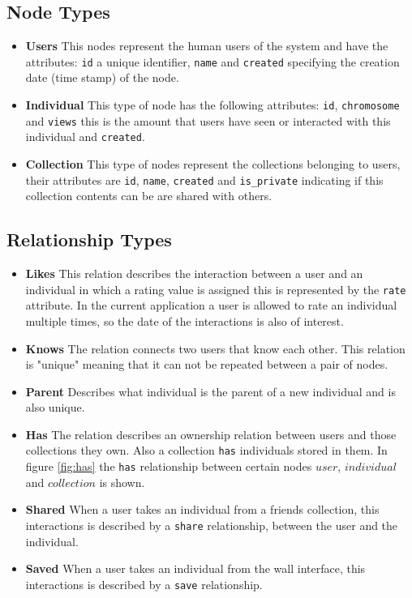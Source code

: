\documentclass[conference]{IEEEtran}
\begin{document}
\subsection{Node Types}
\begin{itemize}

\item {\bf Users} This nodes represent the human users of the system and have 
the attributes: {\tt id} a unique identifier, {\tt name}  and {\tt created}
specifying the  creation date (time stamp) of the node. 

\item {\bf Individual} This type of node has the following attributes: 
{\tt id}, {\tt chromosome}  and {\tt views} this is 
the amount that users have seen or interacted with this individual and
 {\tt created}.

\item {\bf Collection} This type of nodes represent the collections belonging
to users, their attributes are {\tt id}, 
{\tt name}, {\tt created} and {\tt is\_private} indicating if this collection
contents can be are shared with others. 
\end{itemize}

\subsection{Relationship Types}

\begin{itemize}
\item {\bf Likes} This relation describes the interaction between a user and
an individual in which a rating value is assigned this is represented by 
the {\tt rate} attribute. In the current application a user is allowed to rate
an individual multiple times, so the date of the interactions is also of
interest. 

\item {\bf Knows} The relation connects two users that know each
other. This relation is "unique" meaning that it can not be repeated between a pair of nodes. 

\item {\bf Parent} Describes what individual is the parent of a new individual and is also unique.

\item {\bf Has} The relation describes an ownership relation between users and
those collections they own. Also a collection {\tt has}  individuals stored
in them.  In figure \ref{fig:has} the {\tt has} relationship 
between certain nodes $user$, $individual$ and $collection$ is shown.

\item {\bf Shared} When a user takes an individual from a friends collection, this interactions is described by a {\tt share} relationship, between the user and the individual. 

\item {\bf Saved} When a user takes an individual from the wall interface, this 
interactions is described by a {\tt save} relationship. 
\end{itemize}
\end{document}
